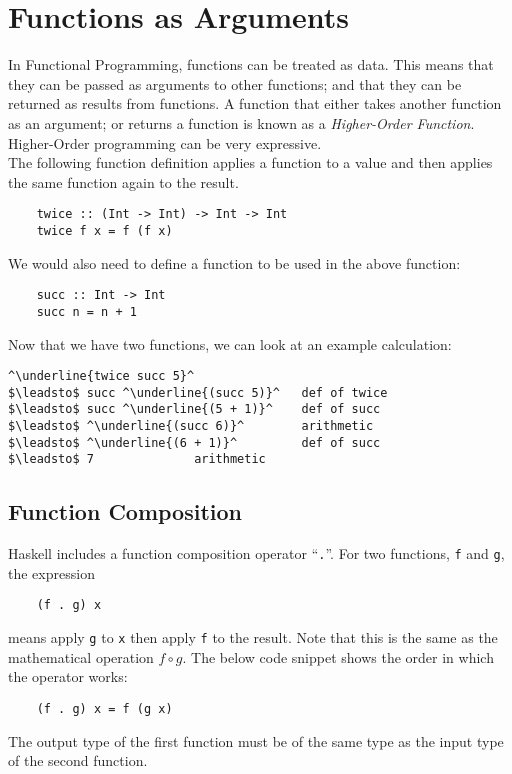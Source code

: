
\section{Functions as Arguments}
In Functional Programming, functions can be treated as data. This means that they can be passed as arguments to other functions; and that they can be returned as results from functions. A function that either takes another function as an argument; or returns a function is known as a \textit{Higher-Order Function}. Higher-Order programming can be very expressive.\\

The following function definition applies a function to a value and then applies the same function again to the result.
\begin{verbatim}
    twice :: (Int -> Int) -> Int -> Int
    twice f x = f (f x)
\end{verbatim}

We would also need to define a function to be used in the above function:
\begin{verbatim}
    succ :: Int -> Int
    succ n = n + 1
\end{verbatim}

Now that we have two functions, we can look at an example calculation:
\begin{lstlisting}[style=haskellTrace]
^\underline{twice succ 5}^
$\leadsto$ succ ^\underline{(succ 5)}^   def of twice
$\leadsto$ succ ^\underline{(5 + 1)}^    def of succ
$\leadsto$ ^\underline{(succ 6)}^        arithmetic
$\leadsto$ ^\underline{(6 + 1)}^         def of succ
$\leadsto$ 7              arithmetic
\end{lstlisting}

\subsection{Function Composition}
Haskell includes a function composition operator ``\verb|.|''. For two functions, \verb|f| and \verb|g|, the expression
\begin{verbatim}
    (f . g) x
\end{verbatim}
means apply \verb|g| to \verb|x| then apply \verb|f| to the result. Note that this is the same as the mathematical operation $f \circ g$. The below code snippet shows the order in which the operator works:
\begin{verbatim}
    (f . g) x = f (g x)
\end{verbatim}
The output type of the first function must be of the same type as the input type of the second function.

